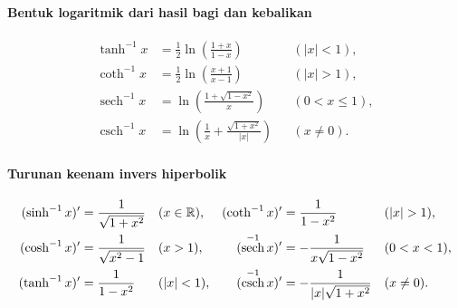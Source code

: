 \documentclass{../../kalkulus-ppt}
\DeclareMathOperator{\sech}{sech}
\DeclareMathOperator{\csch}{csch}
\begin{document}
\begin{frame}{\insertsection}
    \framesubtitle{Bentuk logaritmik dari hasil bagi dan kebalikan}
    \begin{teorema}
        \[
            \begin{aligned}
                \tanh^{-1}x&=\frac12\ln\!\left(\frac{1+x}{1-x}\right)
                    &&(|x|<1),\\
                \coth^{-1}x&=\frac12\ln\!\left(\frac{x+1}{x-1}\right)
                    &&(|x|>1),\\
                \sech^{-1}x&=\ln\!\left(\frac{1+\sqrt{1-x^2}}{x}\right)
                    &&(0<x\le1),\\
                \csch^{-1}x&=\ln\!\left(\frac1x+\frac{\sqrt{1+x^2}}{|x|}\right)
                    &&(x\ne0).
            \end{aligned}
        \]
    \end{teorema}
\end{frame}

\begin{frame}{\insertsection}
    \framesubtitle{Turunan keenam invers hiperbolik}
    \begin{teorema}
        \[
            \begin{aligned}
                (\sinh^{-1}x)'&=\frac1{\sqrt{1+x^2}} &&(x\in\R),&
                (\coth^{-1}x)'&=\frac1{1-x^2} &&(|x|>1),\\
                (\cosh^{-1}x)'&=\frac1{\sqrt{x^2-1}} &&(x>1),&
                (\sech^{-1}x)'&=-\frac1{x\sqrt{1-x^2}} &&(0<x<1),\\
                (\tanh^{-1}x)'&=\frac1{1-x^2} &&(|x|<1),&
                (\csch^{-1}x)'&=-\frac1{|x|\sqrt{1+x^2}} &&(x\ne0).
            \end{aligned}
        \]
    \end{teorema}
\end{frame}
\end{document}
